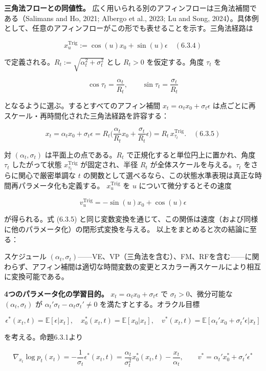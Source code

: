 \textbf{三角法フローとの同値性。} 広く用いられる別のアフィンフローは三角法補間である（Salimans and Ho, 2021; Albergo et al., 2023; Lu and Song, 2024）。具体例として、任意のアフィンフローがこの形でも表せることを示す。三角法経路は

\[
x_u^{\mathrm{Trig}}:=\cos(u)x_0+\sin(u)\epsilon \quad (6.3.4)
\]


で定義される。$R_t:=\sqrt{\alpha_t^2+\sigma_t^2}$ とし $R_t>0$ を仮定する。角度 $\tau_t$ を

\[
\cos\tau_t=\frac{\alpha_t}{R_t},\qquad\sin\tau_t=\frac{\sigma_t}{R_t}
\]


となるように選ぶ。するとすべてのアフィン補間 $x_t=\alpha_t x_0+\sigma_t\epsilon$ は点ごとに再スケール・再時間化された三角法経路を許容する：

\[
x_t=\alpha_t x_0+\sigma_t\epsilon=R_t\Biggl(\frac{\alpha_t}{R_t}x_0+\frac{\sigma_t}{R_t}\epsilon\Biggr)=R_t\,x_{\tau_t}^{\mathrm{Trig}}. \quad (6.3.5)
\]


対 $(\alpha_t,\sigma_t)$ は平面上の点である。$R_t$ で正規化すると単位円上に置かれ、角度 $\tau_t$ したがって状態 $x_{\tau_t}^{\mathrm{Trig}}$ が固定され、半径 $R_t$ が全体スケールを与える。$\tau_t$ をさらに関心で厳密単調な $t$ の関数として選べるなら、この状態水準表現は真正な時間再パラメータ化も定義する。
$x_u^{\mathrm{Trig}}$ を $u$ について微分するとその速度

\[
v_u^{\mathrm{Trig}}=-\sin(u)x_0+\cos(u)\epsilon
\]


が得られる。式 (6.3.5) と同じ変数変換を通じて、この関係は速度（および同様に他のパラメータ化）の閉形式変換を与える。
以上をまとめると次の結論に至る：

\begin{propositionbox}[結論 6.3.1]
スケジュール $(\alpha_t,\sigma_t)$——VE、VP（三角法を含む）、FM、RFを含む——に関わらず、アフィン補間は適切な時間変数の変更とスカラー再スケールにより相互に変換可能である。
\end{propositionbox}


\textbf{4つのパラメータ化の学習目的。} $x_t=\alpha_t x_0+\sigma_t\epsilon$ で $\sigma_t>0$、微分可能な $(\alpha_t,\sigma_t)$ が $\alpha_t'\sigma_t-\alpha_t\sigma_t'\neq 0$ を満たすとする。オラクル目標

\[
\epsilon^*(x_t,t)=\mathbb{E}[\epsilon|x_t],\quad
x_0^*(x_t,t)=\mathbb{E}[x_0|x_t],\quad
v^*(x_t,t)=\mathbb{E}[\alpha_t'x_0+\sigma_t'\epsilon|x_t]
\]


を考える。命題6.3.1より

\[
\nabla_{x_t}\log p_t(x_t)=-\frac{1}{\sigma_t}\epsilon^*(x_t,t)=\frac{\alpha_t}{\sigma_t^2}x_0^*(x_t,t)-\frac{x_t}{\alpha_t},\qquad
v^*=\alpha_t'x_0^*+\sigma_t'\epsilon^*
\]


